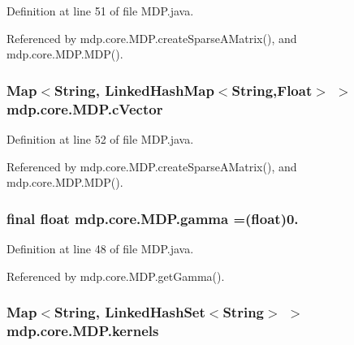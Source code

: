 Definition at line 51 of file M\+D\+P.\+java.



Referenced by mdp.\+core.\+M\+D\+P.\+create\+Sparse\+A\+Matrix(), and mdp.\+core.\+M\+D\+P.\+M\+D\+P().

\hypertarget{classmdp_1_1core_1_1_m_d_p_a80af7879a4ff33ac43034eaa934c480f}{}
\subsubsection[{c\+Vector}]{\setlength{\rightskip}{0pt plus 5cm}Map$<$String, Linked\+Hash\+Map$<$String,Float$>$ $>$ mdp.\+core.\+M\+D\+P.\+c\+Vector\hspace{0.3cm}{\ttfamily [private]}}\label{classmdp_1_1core_1_1_m_d_p_a80af7879a4ff33ac43034eaa934c480f}


Definition at line 52 of file M\+D\+P.\+java.



Referenced by mdp.\+core.\+M\+D\+P.\+create\+Sparse\+A\+Matrix(), and mdp.\+core.\+M\+D\+P.\+M\+D\+P().

\hypertarget{classmdp_1_1core_1_1_m_d_p_ab240c1d97d39d6f66cff0c8d06a57a69}{}
\subsubsection[{gamma}]{\setlength{\rightskip}{0pt plus 5cm}final float mdp.\+core.\+M\+D\+P.\+gamma =(float)0.\hspace{0.3cm}{\ttfamily [private]}}\label{classmdp_1_1core_1_1_m_d_p_ab240c1d97d39d6f66cff0c8d06a57a69}


Definition at line 48 of file M\+D\+P.\+java.



Referenced by mdp.\+core.\+M\+D\+P.\+get\+Gamma().

\hypertarget{classmdp_1_1core_1_1_m_d_p_ac185a95b0c9eb78b9d5a00b214696191}{}
\subsubsection[{kernels}]{\setlength{\rightskip}{0pt plus 5cm}Map$<$String, Linked\+Hash\+Set$<$String$>$ $>$ mdp.\+core.\+M\+D\+P.\+kernels\hspace{0.3cm}{\ttfamily [private]}}\label{classmdp_1_1core_1_1_m_d_p_ac185a95b0c9eb78b9d5a00b214696191}


